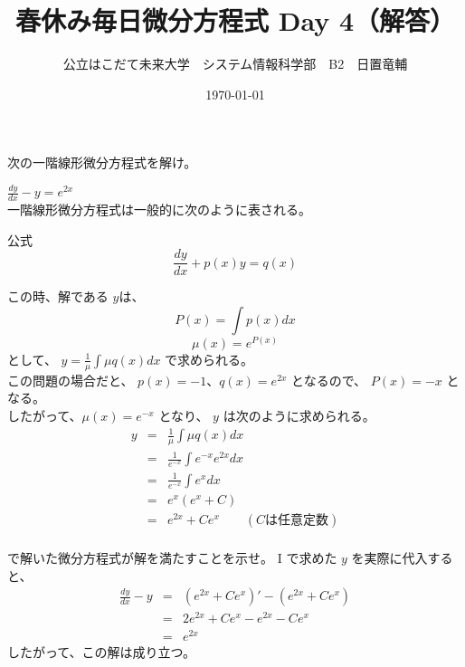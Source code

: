 \documentclass[dvipdfmx,uplatex]{jsarticle}
\title{春休み毎日微分方程式 Day 4（解答）}
\author{公立はこだて未来大学　システム情報科学部　B2　日置竜輔}
\date{\today}
\begin{document}
\begin{spacing}{1.6}
\maketitle

次の一階線形微分方程式を解け。
\begin{qparts}
    \qpart $ \displaystyle \frac{dy}{dx} - y = e ^ {2x} $ \\
    一階線形微分方程式は一般的に次のように表される。\\
    \begin{itembox}{公式}
       \begin{equation}
         \frac{dy}{dx} + p(x)y = q(x) \nonumber
       \end{equation}
    \end{itembox}
     この時、解である $ y $は、\\
     \begin{equation}
       P(x) = \int p(x) dx \nonumber
     \end{equation}
     \begin{equation}
       \mu (x) = e ^ {P(x)} \nonumber
     \end{equation}
     として、 $ \displaystyle y = \frac{1}{\mu} \int \mu q(x) dx $ で求められる。\\
     この問題の場合だと、 $ p(x) =-1 $、$q(x) = e ^ {2x} $ となるので、 $ P(x) = - x $ となる。 \\
     したがって、$ \mu (x) = e ^ {-x} $ となり、 $ y $ は次のように求められる。\\
     \begin{eqnarray*}
       y & = & \frac{1}{\mu} \int \mu q(x) dx \\
       & = & \frac{1}{e ^ {-x}} \int e ^ {-x} e ^ {2x} dx \\
       & = & \frac{1}{e ^ {-x}} \int e ^ x dx \\
       & = & e ^ x (e ^ x + C) \\
       & = & e ^ {2x} + Ce ^ x \qquad (Cは任意定数) \\
     \end{eqnarray*}

      で解いた微分方程式が解を満たすことを示せ。
     {\rm I} で求めた $ y $ を実際に代入すると、 \\
     \begin{eqnarray*}
       \frac{dy}{dx} - y & = & {(e ^ {2x} + Ce ^ x)\prime} - (e ^ {2x} + Ce ^ x) \\
       & = & 2 e ^ {2x} + Ce ^ x - e ^ {2x} - Ce ^ x \\
       & = & e ^ {2x}
     \end{eqnarray*}
     したがって、この解は成り立つ。
\end{qparts}

\end{spacing}
\end{document}
